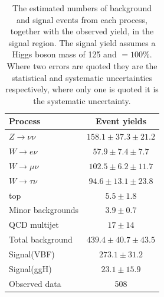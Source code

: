 \begin{table}
  \caption{The estimated numbers of background and signal events from each process, together with the observed yield, in the signal region. The signal yield assumes a Higgs boson mass of 125 \GeV and \BRinv$=100\%$. Where two errors are quoted they are the statistical and systematic uncertainties respectively, where only one is quoted it is the systematic uncertainty.}
  \label{tab:parkedresults}
  \begin{tabular}{lc}
    \hline \hline
    Process & Event yields \\
    \hline
    $Z\rightarrow\nu\nu$&$158.1 \pm 37.3 \pm 21.2$\\
    $W\rightarrow e\nu$&$57.9 \pm 7.4 \pm 7.7$\\
    $W\rightarrow\mu\nu$&$102.5 \pm 6.2 \pm 11.7$\\
    $W\rightarrow\tau\nu$&$94.6 \pm 13.1 \pm 23.8$\\
    top&$5.5 \pm  1.8$\\
    Minor backgrounds&$3.9 \pm 0.7$\\
    QCD multijet &$17\pm 14$\\
    \hline
    Total background &$439.4 \pm 40.7 \pm 43.5 $\\
    \hline
    Signal(VBF) &$273.1 \pm 31.2 $\\
    Signal(ggH) &$23.1 \pm 15.9 $\\
    \hline
    Observed data & 508 \\
    \hline \hline
  \end{tabular}
\end{table}

